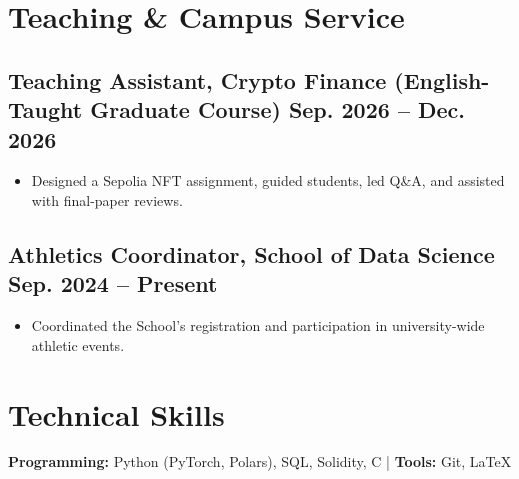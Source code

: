 \documentclass{resume}
\begin{document}
\section{Teaching \& Campus Service}
\subsection{
  \textbf{Teaching Assistant, Crypto Finance (English-Taught Graduate Course)}
  \hfill Sep. 2026 -- Dec. 2026
}
\begin{itemize}[parsep=0.2ex]
  \item Designed a Sepolia NFT assignment, guided students, led Q\&A, and assisted with final-paper reviews.
\end{itemize}

\subsection{
  \textbf{Athletics Coordinator, School of Data Science}
  \hfill Sep. 2024 -- Present
}
\begin{itemize}[parsep=0.2ex]
  \item Coordinated the School's registration and participation in university-wide athletic events.
\end{itemize}

\section{Technical Skills}
\textbf{Programming:} Python (PyTorch, Polars), SQL, Solidity, C
\quad | \quad
\textbf{Tools:} Git, \LaTeX
\end{document}
